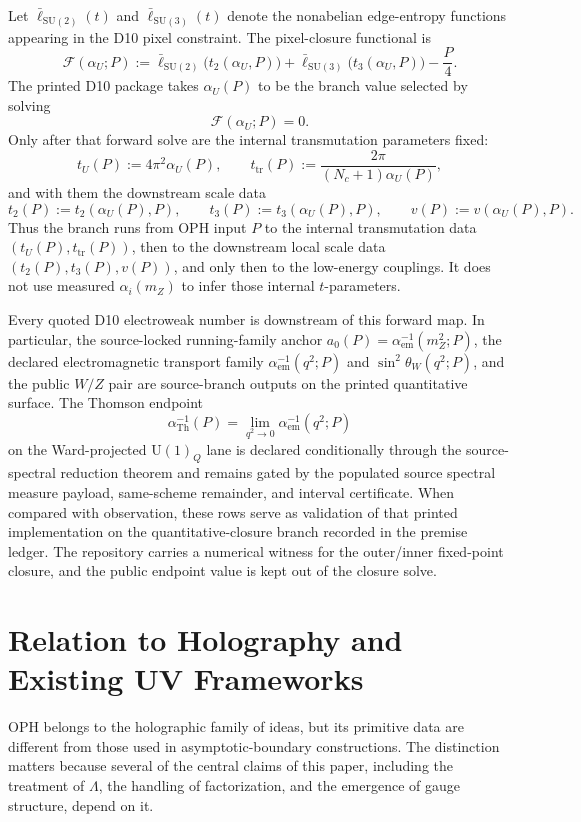 \documentclass[11pt]{article}
\newcommand{\SU}{\mathrm{SU}}
\newcommand{\U}{\mathrm{U}}
\begin{document}
Let \(\bar\ell_{\SU(2)}(t)\) and \(\bar\ell_{\SU(3)}(t)\) denote the nonabelian edge-entropy functions appearing in the D10 pixel constraint. The pixel-closure functional is
\[
\mathcal F(\alpha_U;P)
:=
\bar\ell_{\SU(2)}\!\bigl(t_2(\alpha_U,P)\bigr)
+
\bar\ell_{\SU(3)}\!\bigl(t_3(\alpha_U,P)\bigr)
-\frac{P}{4}.
\]
The printed D10 package takes \(\alpha_U(P)\) to be the branch value selected by solving
\[
\mathcal F(\alpha_U;P)=0.
\]
Only after that forward solve are the internal transmutation parameters fixed:
\[
t_U(P):=4\pi^2\alpha_U(P),
\qquad
t_{\mathrm{tr}}(P):=\frac{2\pi}{(N_c+1)\alpha_U(P)},
\]
and with them the downstream scale data
\[
t_2(P):=t_2(\alpha_U(P),P),
\qquad
t_3(P):=t_3(\alpha_U(P),P),
\qquad
v(P):=v(\alpha_U(P),P).
\]
Thus the branch runs from OPH input \(P\) to the internal transmutation data
\((t_U(P),t_{\mathrm{tr}}(P))\), then to the downstream local scale data
\((t_2(P),t_3(P),v(P))\), and only then to the low-energy couplings. It does not use measured
\(\alpha_i(m_Z)\) to infer those internal \(t\)-parameters.

Every quoted D10 electroweak number is downstream of this forward map. In particular, the
source-locked running-family anchor \(a_0(P)=\alpha_{\mathrm{em}}^{-1}(m_Z^2;P)\), the
declared electromagnetic transport family \(\alpha_{\mathrm{em}}^{-1}(q^2;P)\) and \(\sin^2\theta_W(q^2;P)\), and the public
\(W/Z\) pair are source-branch outputs on the printed quantitative surface. The Thomson endpoint
\[
\alpha_{\mathrm{Th}}^{-1}(P)=\lim_{q^2\to0}\alpha_{\mathrm{em}}^{-1}(q^2;P)
\]
on the Ward-projected \(\U(1)_Q\) lane is declared conditionally through the
source-spectral reduction theorem and remains gated by the populated source
spectral measure payload, same-scheme remainder, and interval certificate. When compared with observation, these rows serve as validation of that printed
implementation on the quantitative-closure branch recorded in the premise ledger. The repository
carries a numerical witness for the outer/inner fixed-point closure, and the public endpoint
value is kept out of the closure solve.

\section{Relation to Holography and Existing UV Frameworks}

OPH belongs to the holographic family of ideas, but its primitive data are different from those used in asymptotic-boundary constructions. The distinction matters because several of the central claims of this paper, including the treatment of $\Lambda$, the handling of factorization, and the emergence of gauge structure, depend on it.
\end{document}
